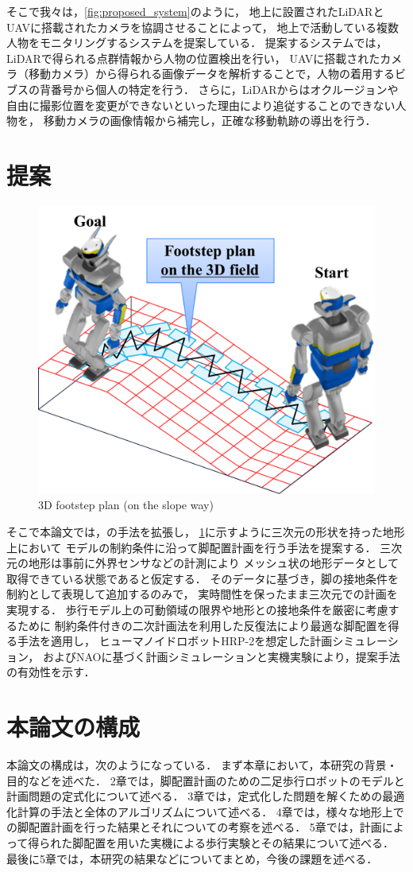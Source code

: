 \documentclass[autodetect-engine,dvipdfmx-if-dvi,ja=standard,a4j,jbase=11pt,magstyle=nomag*]{bxjsreport}
\begin{document}
そこで我々は，\cref{fig:proposed_system}のように，
地上に設置されたLiDARとUAVに搭載されたカメラを協調させることによって，
地上で活動している複数人物をモニタリングするシステムを提案している．
提案するシステムでは，LiDARで得られる点群情報から人物の位置検出を行い，
UAVに搭載されたカメラ（移動カメラ）から得られる画像データを解析することで，人物の着用するビブスの背番号から個人の特定を行う．
さらに，LiDARからはオクルージョンや自由に撮影位置を変更ができないといった理由により追従することのできない人物を，
移動カメラの画像情報から補完し，正確な移動軌跡の導出を行う．


\section{提案}
\begin{figure}[t]
    \centering
    \includegraphics[width=0.8\linewidth, clip]{./figure/concept.pdf}
    \caption{3D footstep plan (on the slope way)}
    \label{fig:concept}
\end{figure}

そこで本論文では，\cite{yao_2011rs}の手法を拡張し，
\cref{fig:concept}に示すように三次元の形状を持った地形上において
モデルの制約条件に沿って脚配置計画を行う手法を提案する．
三次元の地形は事前に外界センサなどの計測により
メッシュ状の地形データとして取得できている状態であると仮定する．
そのデータに基づき，脚の接地条件を制約として表現して追加するのみで，
実時間性を保ったまま三次元での計画を実現する．
歩行モデル上の可動領域の限界や地形との接地条件を厳密に考慮するために
制約条件付きの二次計画法を利用した反復法により最適な脚配置を得る手法を適用し，
ヒューマノイドロボットHRP-2\cite{isozumi_2004jrsj}を想定した計画シミュレーション，
およびNAO\cite{mao_official}に基づく計画シミュレーションと実機実験により，提案手法の有効性を示す．


\section{本論文の構成}
本論文の構成は，次のようになっている．
まず本章において，本研究の背景・目的などを述べた．
2章では，脚配置計画のための二足歩行ロボットのモデルと計画問題の定式化について述べる．
3章では，定式化した問題を解くための最適化計算の手法と全体のアルゴリズムについて述べる．
4章では，様々な地形上での脚配置計画を行った結果とそれについての考察を述べる．
5章では，計画によって得られた脚配置を用いた実機による歩行実験とその結果について述べる．
最後に5章では，本研究の結果などについてまとめ，今後の課題を述べる．
\end{document}
